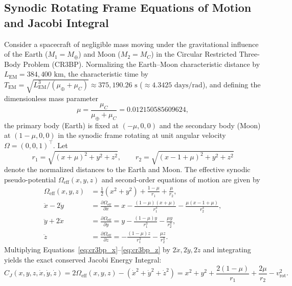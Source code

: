 \documentclass[11pt,a4paper,reqno]{article}
\def\bm#1{#1}%
\def\mathbb#1{#1}%
\theoremstyle{plain}
\theoremstyle{definition}
\theoremstyle{remark}
\numberwithin{equation}{section}
\begin{document}
\subsection{Synodic Rotating Frame Equations of Motion and Jacobi Integral}
Consider a spacecraft of negligible mass moving under the gravitational influence of the Earth ($M_1 = M_\oplus$) and Moon ($M_2 = M_{\mathbb{C}}$) in the Circular Restricted Three-Body Problem (CR3BP). Normalizing the Earth--Moon characteristic distance by $L_{\text{EM}} = 384,400\text{ km}$, the characteristic time by $T_{\text{EM}} = \sqrt{L_{\text{EM}}^3 / (\mu_\oplus + \mu_{\mathbb{C}})} \approx 375,190.26\text{ s}$ ($\approx 4.3425\text{ days/rad}$), and defining the dimensionless mass parameter
\begin{equation}
  \mu = \frac{\mu_{\mathbb{C}}}{\mu_\oplus + \mu_{\mathbb{C}}} = 0.012150585609624,
  \label{eq:cr3bp_mu}
\end{equation}
the primary body (Earth) is fixed at $(-\mu, 0, 0)$ and the secondary body (Moon) at $(1 - \mu, 0, 0)$ in the synodic frame rotating at unit angular velocity $\bm{\Omega} = (0, 0, 1)^\top$. Let
\begin{equation}
  r_1 = \sqrt{(x + \mu)^2 + y^2 + z^2}, \qquad r_2 = \sqrt{(x - 1 + \mu)^2 + y^2 + z^2}
  \label{eq:r1_r2_def}
\end{equation}
denote the normalized distances to the Earth and Moon. The effective synodic pseudo-potential $\Omega_{\text{eff}}(x, y, z)$ and second-order equations of motion are given by
\begin{align}
  \Omega_{\text{eff}}(x, y, z) &= \frac{1}{2}(x^2 + y^2) + \frac{1 - \mu}{r_1} + \frac{\mu}{r_2}, \label{eq:pseudo_potential} \\
  \ddot{x} - 2\dot{y} &= \frac{\partial \Omega_{\text{eff}}}{\partial x} = x - \frac{(1 - \mu)(x + \mu)}{r_1^3} - \frac{\mu(x - 1 + \mu)}{r_2^3}, \label{eq:cr3bp_x} \\
  \ddot{y} + 2\dot{x} &= \frac{\partial \Omega_{\text{eff}}}{\partial y} = y - \frac{(1 - \mu)y}{r_1^3} - \frac{\mu y}{r_2^3}, \label{eq:cr3bp_y} \\
  \ddot{z} &= \frac{\partial \Omega_{\text{eff}}}{\partial z} = -\frac{(1 - \mu)z}{r_1^3} - \frac{\mu z}{r_2^3}. \label{eq:cr3bp_z}
\end{align}
Multiplying Equations~\eqref{eq:cr3bp_x}--\eqref{eq:cr3bp_z} by $2\dot{x}, 2\dot{y}, 2\dot{z}$ and integrating yields the exact conserved Jacobi Energy Integral:
\begin{equation}
  C_J(x, y, z, \dot{x}, \dot{y}, \dot{z}) = 2\Omega_{\text{eff}}(x, y, z) - (\dot{x}^2 + \dot{y}^2 + \dot{z}^2) = x^2 + y^2 + \frac{2(1-\mu)}{r_1} + \frac{2\mu}{r_2} - v_{\text{rot}}^2.
  \label{eq:jacobi_integral}
\end{equation}
\end{document}

